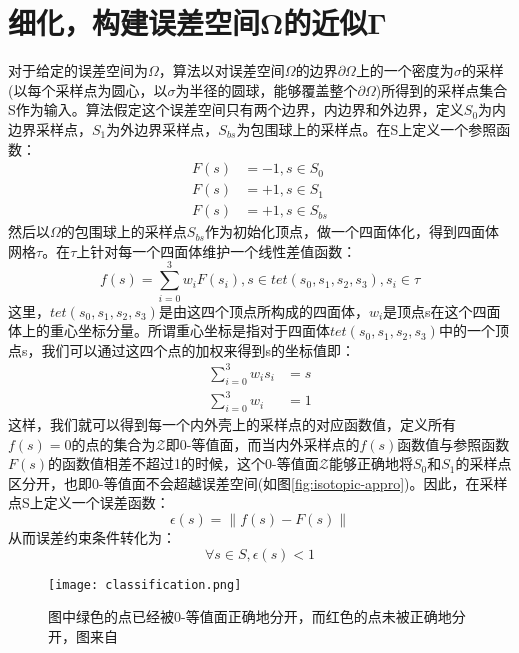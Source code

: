 \section{细化，构建误差空间Ω的近似Γ}
对于给定的误差空间为$\Omega$，算法以对误差空间$\Omega$的边界$\partial \Omega$上的一个密度为$\sigma$的采样(以每个采样点为圆心，以$\sigma$为半径的圆球，能够覆盖整个$\partial \Omega$)所得到的采样点集合S作为输入。算法假定这个误差空间只有两个边界，内边界和外边界，定义$S_0$为内边界采样点，$S_1$为外边界采样点，$S_{bs}$为包围球上的采样点。在S上定义一个参照函数：
\begin{equation}
  \begin{split}
    F(s) &= -1, s\in S_0\\
    F(s) &= +1, s\in S_1\\
    F(s) &= +1, s\in S_{bs}
  \end{split}
\end{equation}
然后以$\Omega$的包围球上的采样点$S_{bs}$作为初始化顶点，做一个四面体化，得到四面体网格$\tau$。在$\tau$上针对每一个四面体维护一个线性差值函数：
\begin{equation}
  f(s) = \sum_{i=0}^3 w_iF(s_i), s\in tet(s_0, s_1, s_2, s_3), s_i \in \tau
  \label{eq:linear-interpolation}
\end{equation}
这里，$tet(s_0, s_1, s_2, s_3)$是由这四个顶点所构成的四面体，$w_i$是顶点s在这个四面体上的重心坐标分量。所谓重心坐标是指对于四面体$tet(s_0, s_1, s_2, s_3)$中的一个顶点s，我们可以通过这四个点的加权来得到s的坐标值即：
\begin{equation}
  \begin{split}
  \sum_{i=0}^3 w_i s_i &= s\\
  \sum_{i=0}^3 w_i &= 1
  \end{split}
  \label{eq:err-constraint}
\end{equation}
这样，我们就可以得到每一个内外壳上的采样点的对应函数值，定义所有$f(s)=0$的点的集合为$\mathcal{Z}$即0-等值面，而当内外采样点的$f(s)$函数值与参照函数$F(s)$的函数值相差不超过1的时候，这个0-等值面$\mathcal{Z}$能够正确地将$S_0$和$S_1$的采样点区分开，也即0-等值面不会超越误差空间(如图\ref{fig:isotopic-appro})。因此，在采样点S上定义一个误差函数：
\begin{equation}
  \epsilon(s) = \lVert f(s)-F(s) \rVert
\end{equation}
从而误差约束条件转化为：
\begin{equation}
  \forall s \in S, \epsilon(s)<1
\end{equation}

\begin{figure}[htbp]
    \centering
    \texttt{[image: classification.png]}
    \caption{图中绿色的点已经被0-等值面正确地分开，而红色的点未被正确地分开，图来自\cite{isotopic-appro}}
    \label{fig:isotopic-classification}
\end{figure}

